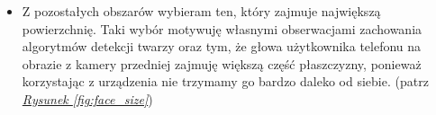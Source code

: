 \begin{itemize}
    \item Z pozostałych obszarów wybieram ten, który zajmuje największą powierzchnię. Taki wybór motywuję własnymi obserwacjami zachowania algorytmów detekcji twarzy oraz tym, że głowa użytkownika telefonu na obrazie z kamery przedniej zajmuję większą część płaszczyzny, ponieważ korzystając z urządzenia nie trzymamy go bardzo daleko od siebie. (patrz \hyperref[{fig:face_size}]{\textit{Rysunek \ref{fig:face_size}}})
    
    \begin{figure}[!h]
        \begin{center}
            \hspace{8mm}

\end{center}
\end{figure}
\end{itemize}
